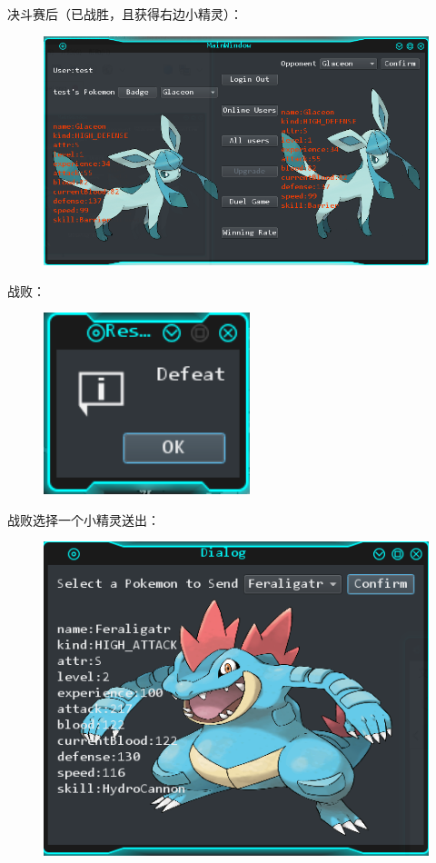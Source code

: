 \documentclass{ctexart}
\begin{document}
决斗赛后（已战胜，且获得右边小精灵）：
\begin{figure}[H]
  \centering
  \includegraphics[width=15cm]{stage3-afterDuel.png}
\end{figure}
\pagebreak[4]
战败：
\begin{figure}[H]
  \centering
  \includegraphics[width=6cm]{stage3-defeat.png}
\end{figure}
战败选择一个小精灵送出：
\begin{figure}[H]
  \centering
  \includegraphics[width=15cm]{stage3-selectPkm.png}
\end{figure}
\end{document}
